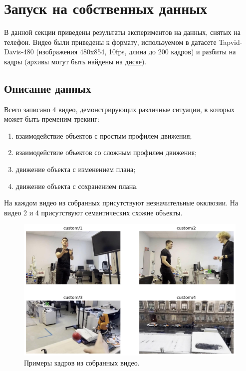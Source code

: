 \documentclass[a4paper, 14pt]{extarticle}
\theoremstyle{definition}
\theoremstyle{plain}
\theoremstyle{remark}
\begin{document}
\section{Запуск на собственных данных}
В данной секции приведены результаты экспериментов на данных, снятых на телефон. Видео были приведены к формату, используемом в датасете Tapvid-Davis-480 (изображения 480x854, 10fps, длина до 200 кадров) и разбиты на кадры (архивы могут быть найдены на \href{https://drive.google.com/drive/folders/1kL4srq3aIuJvA-0jlK886FdR1ZIgu8Ui?usp=drive_link}{диске}). 

\subsection{Описание данных}
Всего записано 4 видео, демонстрирующих различные ситуации, в которых может быть пременим трекинг:
\begin{enumerate}
	\item взаимодействие объектов с простым профилем движения;
	\item взаимодействие объектов со сложным профилем движения;
	\item движение объекта с изменением плана;
	\item движение объекта с сохранением плана.
\end{enumerate}

На каждом видео из собранных присутствуют незначительные окклюзии. На видео 2 и 4 присутствуют семантических схожие объекты. 
\begin{figure}
    [H]
    \centering
    \includegraphics[width=\textwidth]{figs/custom_expl.png}
    \caption{Примеры кадров из собранных видео.}
    \label{fig:custom-expl}
\end{figure}
\end{document}
